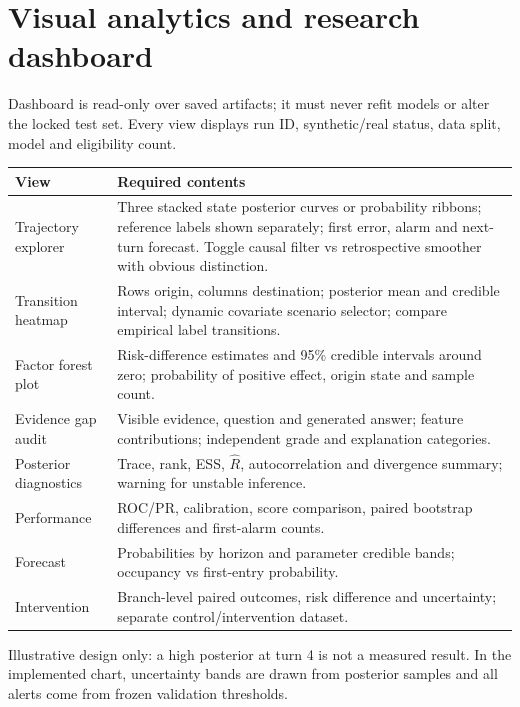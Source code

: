 \documentclass[11pt,letterpaper]{article}
\newcommand{\sectionpage}[1]{\clearpage\section{#1}}
\begin{document}
\sectionpage{Visual analytics and research dashboard}
Dashboard is read-only over saved artifacts; it must never refit models or alter the locked test set. Every view displays run ID, synthetic/real status, data split, model and eligibility count.

\begin{tabularx}{\linewidth}{p{.28\linewidth}X}
\toprule View & Required contents \\ \midrule
Trajectory explorer & Three stacked state posterior curves or probability ribbons; reference labels shown separately; first error, alarm and next-turn forecast. Toggle causal filter vs retrospective smoother with obvious distinction. \\
Transition heatmap & Rows origin, columns destination; posterior mean and credible interval; dynamic covariate scenario selector; compare empirical label transitions. \\
Factor forest plot & Risk-difference estimates and 95\% credible intervals around zero; probability of positive effect, origin state and sample count. \\
Evidence gap audit & Visible evidence, question and generated answer; feature contributions; independent grade and explanation categories. \\
Posterior diagnostics & Trace, rank, ESS, $\widehat R$, autocorrelation and divergence summary; warning for unstable inference. \\
Performance & ROC/PR, calibration, score comparison, paired bootstrap differences and first-alarm counts. \\
Forecast & Probabilities by horizon and parameter credible bands; occupancy vs first-entry probability. \\
Intervention & Branch-level paired outcomes, risk difference and uncertainty; separate control/intervention dataset. \\ \bottomrule
\end{tabularx}

\begin{center}
\end{center}
\small Illustrative design only: a high posterior at turn 4 is not a measured result. In the implemented chart, uncertainty bands are drawn from posterior samples and all alerts come from frozen validation thresholds.
\end{document}
